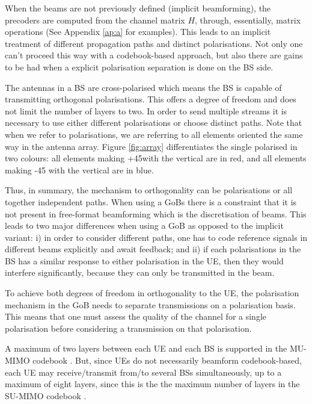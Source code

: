 When the beams are not previously defined (implicit beamforming), the precoders are computed from the channel matrix $H$, through, essentially, matrix operations (See Appendix \ref{ap:a} for examples). This leads to an implicit treatment of different propagation paths and distinct polarisations. Not only one can't proceed this way with a codebook-based approach, but also there are gains to be had when a explicit polarisation separation is done on the BS side.

The antennas in a BS are cross-polarised \cite{3gpp-antennas} which means the BS is capable of transmitting orthogonal polarisations. This offers a degree of freedom and does not limit the number of layers to two. In order to send multiple streams it is necessary to use either different polarisations or choose distinct paths. Note that when we refer to polarisations, we are referring to all elements oriented the same way in the antenna array. Figure \ref{fig:array} differentiates the single polarised in two colours: all elements making +45\textdegree with the vertical are in red, and all elements making -45 \textdegree with the vertical are in blue.



Thus, in summary, the mechanism to orthogonality can be polarisations or all together independent paths. When using a GoBs there is a constraint that it is not present in free-format beamforming which is the discretisation of beams. This leads to two major differences when using a GoB as opposed to the implicit variant: i) in order to consider different paths, one has to code reference signals in different beams explicitly and await feedback; and ii) if each polarisations in the BS has a similar response to either polarisation in the UE, then they would interfere significantly, because they can only be transmitted in the beam.

To achieve both degrees of freedom in orthogonality to the UE, the polarisation mechanism in the GoB needs to separate transmissions on a polarisation basis. This means that one must assess the quality of the channel for a single polarisation before considering a transmission on that polarisation. 


A maximum of two layers between each UE and each BS is supported in the MU-MIMO codebook \cite{3gpp-codebooks}. But, since UEs do not necessarily beamform codebook-based, each UE may receive/transmit from/to several BSs simultaneously, up to a maximum of eight layers, since this is the the maximum number of layers in the SU-MIMO codebook \cite{3gpp-codebooks}.


